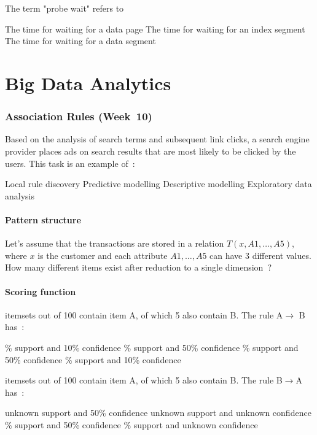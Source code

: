 \documentclass[12pt,a4paper]{exam} %
\begin{document}
\begin{flushleft}
\begin{multicols*}{2}
\begin{questions}
\question The term "probe wait" refers to
\begin{checkboxes}
\choice The time for waiting for a data page
\CorrectChoice The time for waiting for an index segment
\choice The time for waiting for a data segment
\end{checkboxes}

\part{Big Data Analytics}
\section{Association Rules (Week~10)}
\question Based on the analysis of search terms and subsequent link clicks, a search engine provider places ads on  search results that are most likely to be clicked by the users.
This task is an example of~:
\begin{checkboxes}
\choice Local rule discovery
\CorrectChoice Predictive modelling
\choice Descriptive modelling
\choice Exploratory data analysis
\end{checkboxes}

\subsection{Pattern structure}
\question Let’s assume that the transactions are stored in a relation $T(x, A1, \ldots, A5)$, where $x$ is the customer and each attribute $A1, \ldots, A5$ can have 3 different values. How many different items exist after reduction to a single dimension~?
\begin{checkboxes}
\end{checkboxes}

\subsection{Scoring function}
 itemsets out of 100 contain item A, of which 5 also contain B. The rule A$\rightarrow$ B has~:
\begin{checkboxes}
\% support and 10\% confidence
\% support and 50\% confidence
\% support and 50\% confidence
\% support and 10\% confidence
\end{checkboxes}

 itemsets out of 100 contain item A, of which 5 also contain B. The rule B$\rightarrow$A has~:
\begin{checkboxes}
\choice unknown support and 50\% confidence
\choice unknown support and unknown confidence
\% support and 50\% confidence
\% support and unknown confidence
\end{checkboxes}


\end{questions}
\end{multicols*}
\end{flushleft}
\end{document}
